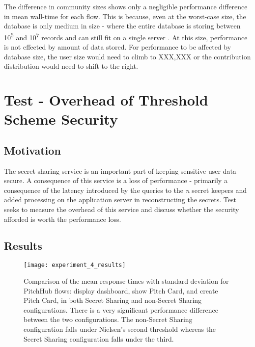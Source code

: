 The difference in community sizes shows only a negligible performance difference in mean wall-time for each flow. This is because, even at the worst-case size, the database is only medium in size - where the entire database is storing between 10\textsuperscript{5} and 10\textsuperscript{7} records and can still fit on a single server \cite{Large8:online}. At this size, performance is not effected by amount of data stored. For performance to be affected by database size, the user size would need to climb to XXX,XXX or the contribution distribution would need to shift to the right.

\section{Test  - Overhead of Threshold Scheme Security}

\subsection{Motivation}
The secret sharing service is an important part of keeping sensitive user data secure. A consequence of this service is a loss of performance - primarily a consequence of the latency introduced by the queries to the \textit{n} secret keepers and added processing on the application server in reconstructing the secrets. Test  seeks to measure the overhead of this service and discuss whether the security afforded is worth the performance loss.

\subsection{Results}

\begin{figure}[ht]
    \centering
    \texttt{[image: experiment\_4\_results]}
    \caption{Comparison of the mean response times with standard deviation for PitchHub flows: display dashboard, show Pitch Card, and create Pitch Card, in both Secret Sharing and non-Secret Sharing configurations. There is a very significant performance difference between the two configurations. The non-Secret Sharing configuration falls under Nielsen's second threshold whereas the Secret Sharing configuration falls under the third. }
    \label{fig:test_4_results}
\end{figure}

